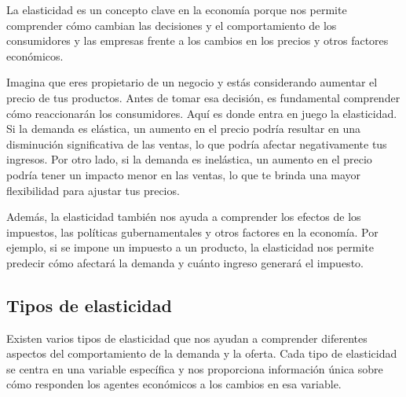 \documentclass[
  jou,
  floatsintext,
  longtable,
  a4paper,
  nolmodern,
  notxfonts,
  notimes,
  colorlinks=true,linkcolor=blue,citecolor=blue,urlcolor=blue]{apa7}
\begin{document}
La elasticidad es un concepto clave en la economía porque nos permite
comprender cómo cambian las decisiones y el comportamiento de los
consumidores y las empresas frente a los cambios en los precios y otros
factores económicos.

Imagina que eres propietario de un negocio y estás considerando aumentar
el precio de tus productos. Antes de tomar esa decisión, es fundamental
comprender cómo reaccionarán los consumidores. Aquí es donde entra en
juego la elasticidad. Si la demanda es elástica, un aumento en el precio
podría resultar en una disminución significativa de las ventas, lo que
podría afectar negativamente tus ingresos. Por otro lado, si la demanda
es inelástica, un aumento en el precio podría tener un impacto menor en
las ventas, lo que te brinda una mayor flexibilidad para ajustar tus
precios.

Además, la elasticidad también nos ayuda a comprender los efectos de los
impuestos, las políticas gubernamentales y otros factores en la
economía. Por ejemplo, si se impone un impuesto a un producto, la
elasticidad nos permite predecir cómo afectará la demanda y cuánto
ingreso generará el impuesto.

\subsection{Tipos de elasticidad}\label{tipos-de-elasticidad}

Existen varios tipos de elasticidad que nos ayudan a comprender
diferentes aspectos del comportamiento de la demanda y la oferta. Cada
tipo de elasticidad se centra en una variable específica y nos
proporciona información única sobre cómo responden los agentes
económicos a los cambios en esa variable.
\end{document}
